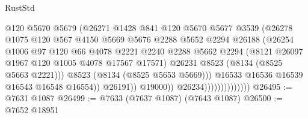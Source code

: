 \begin{lexlean}{RustStd}
\begin{coremodule}
{\begin{coremodule}
{{{{{{{{{{{{{{{{{{{{{{{{{{{{{{{{{{{{{{{{{{{{{{{{{{{{{                                          @120
                                          @5670
                                          @5679
                                          (@26271
                                            @1428
                                            @841
                                            @120
                                            @5670
                                            @5677
                                            @3539
                                            (@26278
                                              @1075
                                              @120
                                              @567
                                              @4150
                                              @5669
                                              @5676
                                              @2288
                                              @5652
                                              @2294
                                              @26188
                                              (@26254
                                                @1006
                                                @97
                                                @120
                                                @66
                                                @4078
                                                @2221
                                                @2240
                                                @2288
                                                @5662
                                                @2294
                                                (@8121 @26097 @1967 @120 @1005 @4078 @17567 @17571)
                                                @26231
                                                @8523
                                                (@8134 (@8525 @5663 @2221)))
                                              @8523
                                              (@8134 (@8525 @5653 @5669)))
                                            @16533
                                            @16536
                                            @16539
                                            @16543
                                            @16548
                                            @16554))
                                        @26191))
                                    @19000))
                                @26234))))))))))))))
@26495 := @7631 @1087
@26499 := @7633 (@7637 @1087) (@7643 @1087)
@26500 := @7652 @18951
}}}}}}}}}}}}}}}}}}}}}}}}}}}}}}}}}}}}}}}}}}}}}}}}}}}}}
\end{coremodule}}
\end{coremodule}
\end{lexlean}
